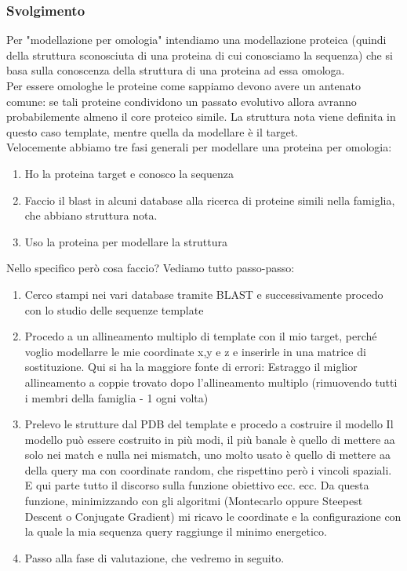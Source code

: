 \documentclass{article}
\begin{document}
\subsubsection*{Svolgimento}
Per "modellazione per omologia" intendiamo una modellazione proteica (quindi della struttura sconosciuta di una proteina di cui conosciamo la sequenza) che si basa sulla conoscenza della struttura di una proteina ad essa omologa.\\
Per essere omologhe le proteine come sappiamo devono avere un antenato comune: se tali proteine condividono un passato evolutivo allora avranno probabilemente almeno il core proteico simile. La struttura nota viene definita in questo caso template, mentre quella da modellare è il target.\\
Velocemente abbiamo tre fasi generali per modellare una proteina per omologia:
\begin{enumerate}
    \item Ho la proteina target e conosco la sequenza
    \item Faccio il blast in alcuni database alla ricerca di proteine simili nella famiglia, che abbiano struttura nota.
    \item Uso la proteina per modellare la struttura
\end{enumerate}
Nello specifico però cosa faccio? Vediamo tutto passo-passo:
\begin{enumerate}
    \item Cerco stampi nei vari database tramite BLAST e successivamente procedo con lo studio delle sequenze template
    \item Procedo a un allineamento multiplo di template con il mio target, perché voglio modellarre le mie coordinate x,y e z e inserirle in una matrice di sostituzione. Qui si ha la maggiore fonte di errori:
    Estraggo il miglior allineamento a coppie trovato dopo l'allineamento multiplo (rimuovendo tutti i membri della famiglia - 1 ogni volta)
    \item Prelevo le strutture dal PDB del template e procedo a costruire il modello
    Il modello può essere costruito in più modi, il più banale è quello di mettere aa solo nei match e nulla nei mismatch, uno molto usato è quello di mettere aa della query ma con coordinate random, che rispettino però i vincoli spaziali. E qui parte tutto il discorso sulla funzione obiettivo ecc. ecc. Da questa funzione, minimizzando con gli algoritmi (Montecarlo oppure Steepest Descent o Conjugate Gradient) mi ricavo le coordinate e la configurazione con la quale la mia sequenza query raggiunge il minimo energetico.
    \item Passo alla fase di valutazione, che vedremo in seguito.
\end{enumerate}
\end{document}
